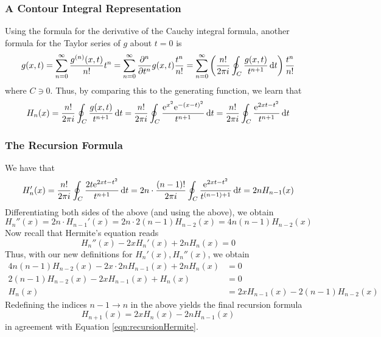 \documentclass[titlepage]{article}
\numberwithin{equation}{section}
\begin{document}
\subsubsection{A Contour Integral Representation}
Using the formula for the derivative of the Cauchy integral formula, another formula for the Taylor series of $g$ about $t=0$ is
\begin{equation*}
    g(x,t) = \sum_{n=0}^\infty\frac{g^{(n)}(x,t)}{n!}t^n
    = \sum_{n=0}^\infty\pdv[n]{t}g(x,t)\frac{t^n}{n!}
    = \sum_{n=0}^\infty\left( \frac{n!}{2\pi i}\oint_C\frac{g(x,t)}{t^{n+1}}\dd{t} \right)\frac{t^n}{n!}
\end{equation*}
where $C\ni 0$. Thus, by comparing this to the generating function, we learn that
\begin{equation*}
    H_n(x) = \frac{n!}{2\pi i}\oint_C\frac{g(x,t)}{t^{n+1}}\dd{t}
    = \frac{n!}{2\pi i}\oint_C\frac{\e[x^2]\e[-(x-t)^2]}{t^{n+1}}\dd{t}
    = \frac{n!}{2\pi i}\oint_C\frac{\e[2xt-t^2]}{t^{n+1}}\dd{t}
\end{equation*}

\subsubsection{The Recursion Formula}
We have that
\begin{equation*}
    H_n'(x) = \frac{n!}{2\pi i}\oint_C\frac{2t\e[2xt-t^2]}{t^{n+1}}\dd{t}
    = 2n\cdot \frac{(n-1)!}{2\pi i}\oint_C\frac{\e[2xt-t^2]}{t^{(n-1)+1}}\dd{t}
    = 2nH_{n-1}(x)
\end{equation*}
Differentiating both sides of the above (and using the above), we obtain
\begin{equation*}
    H_n''(x) = 2n\cdot H_{n-1}'(x)
    = 2n\cdot 2(n-1)H_{n-2}(x)
    = 4n(n-1)H_{n-2}(x)
\end{equation*}
Now recall that Hermite's equation reads
\begin{equation*}
    H_n''(x)-2xH_n'(x)+2nH_n(x) = 0
\end{equation*}
Thus, with our new definitions for $H_n'(x),H_n''(x)$, we obtain
\begin{align*}
    4n(n-1)H_{n-2}(x)-2x\cdot 2nH_{n-1}(x)+2nH_n(x) &= 0\\
    2(n-1)H_{n-2}(x)-2xH_{n-1}(x)+H_n(x) &= 0\\
    H_n(x) &= 2xH_{n-1}(x)-2(n-1)H_{n-2}(x)
\end{align*}
Redefining the indices $n-1\to n$ in the above yields the final recursion formula
\begin{equation*}
    H_{n+1}(x) = 2xH_n(x)-2nH_{n-1}(x)
\end{equation*}
in agreement with Equation \ref{eqn:recursionHermite}.
\newpage
\end{document}
